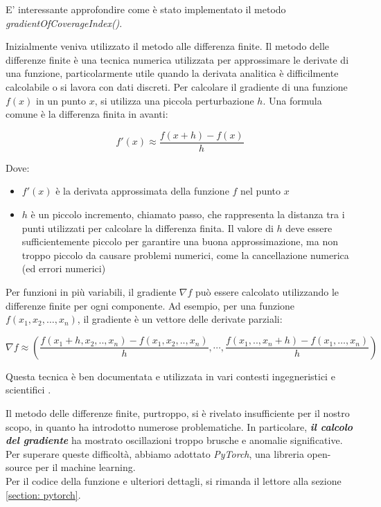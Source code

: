 \documentclass[twoside]{article}
\begin{document}
\vspace{\baselineskip}

E' interessante approfondire come è stato implementato il metodo \textit{gradientOfCoverageIndex()}.

\vspace{\baselineskip}

Inizialmente veniva utilizzato il metodo alle differenza finite. Il metodo delle differenze finite è una tecnica numerica utilizzata per approssimare le derivate di una funzione, particolarmente utile quando la derivata analitica è difficilmente calcolabile o si lavora con dati discreti. Per calcolare il gradiente di una funzione \(f(x)\) in un punto \(x\), si utilizza una piccola perturbazione \(h\). Una formula comune è la differenza finita in avanti:

\begin{equation}
f'(x) \approx \frac{f(x+h) - f(x)}{h}
\end{equation}


Dove:
\begin{itemize}
    \item \(f'(x)\) è la derivata approssimata della funzione \(f\) nel punto \(x\)
    \item \(h\) è un piccolo incremento, chiamato passo, che rappresenta la distanza tra i punti utilizzati per calcolare la differenza finita. Il valore di \(h\) deve essere sufficientemente piccolo per garantire una buona approssimazione, ma non troppo piccolo da causare problemi numerici, come la cancellazione numerica (ed errori numerici)
\end{itemize}

Per funzioni in più variabili, il gradiente \(\nabla f\) può essere calcolato utilizzando le differenze finite per ogni componente. Ad esempio, per una funzione \(f(x_1, x_2, \ldots, x_n)\), il gradiente è un vettore delle derivate parziali:

\begin{equation}
\nabla f \approx \left( \frac{f(x_1 + h, x_2, .., x_n) - f(x_1, x_2, .., x_n)}{h}, \cdots, \frac{f(x_1, .., x_n + h) - f(x_1, \ldots, x_n)}{h} \right)
\end{equation}

Questa tecnica è ben documentata e utilizzata in vari contesti ingegneristici e scientifici \cite{Hoffman, Epperson}.

\vspace{\baselineskip}

Il metodo delle differenze finite, purtroppo, si è rivelato insufficiente per il nostro scopo, in quanto ha introdotto numerose problematiche. In particolare, \textit{\textbf{il calcolo del gradiente}} ha mostrato oscillazioni troppo brusche e anomalie significative. Per superare queste difficoltà, abbiamo adottato \textit{PyTorch}, una libreria open-source per il machine learning.\\
Per il codice della funzione e ulteriori dettagli, si rimanda il lettore alla sezione \ref{section: pytorch}.
\end{document}
